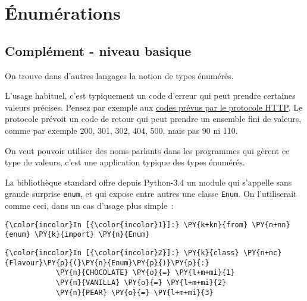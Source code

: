     
    
    
    

    

    \hypertarget{uxe9numuxe9rations}{%
\section{Énumérations}\label{uxe9numuxe9rations}}

    \hypertarget{compluxe9ment---niveau-basique}{%
\subsection{Complément - niveau
basique}\label{compluxe9ment---niveau-basique}}

    On trouve dans d'autres langages la notion de types énumérés.

    L'usage habituel, c'est typiquement un code d'erreur qui peut prendre
certaines valeurs précises. Pensez par exemple aux
\href{https://fr.wikipedia.org/wiki/Liste_des_codes_HTTP}{codes prévus
par le protocole HTTP}. Le protocole prévoit un code de retour qui peut
prendre un ensemble fini de valeurs, comme par exemple 200, 301, 302,
404, 500, mais pas 90 ni 110.

    On veut pouvoir utiliser des noms parlants dans les programmes qui
gèrent ce type de valeurs, c'est une application typique des types
énumérés.

    La bibliothèque standard offre depuis Python-3.4 un module qui s'appelle
sans grande surprise \texttt{enum}, et qui expose entre autres une
classe \texttt{Enum}. On l'utiliserait comme ceci, dans un cas d'usage
plus simple~:

    \begin{Verbatim}[commandchars=\\\{\},frame=single,framerule=0.3mm,rulecolor=\color{cellframecolor}]
{\color{incolor}In [{\color{incolor}1}]:} \PY{k+kn}{from} \PY{n+nn}{enum} \PY{k}{import} \PY{n}{Enum}
\end{Verbatim}


    \begin{Verbatim}[commandchars=\\\{\},frame=single,framerule=0.3mm,rulecolor=\color{cellframecolor}]
{\color{incolor}In [{\color{incolor}2}]:} \PY{k}{class} \PY{n+nc}{Flavour}\PY{p}{(}\PY{n}{Enum}\PY{p}{)}\PY{p}{:}
            \PY{n}{CHOCOLATE} \PY{o}{=} \PY{l+m+mi}{1}
            \PY{n}{VANILLA} \PY{o}{=} \PY{l+m+mi}{2}
            \PY{n}{PEAR} \PY{o}{=} \PY{l+m+mi}{3}
\end{Verbatim}


